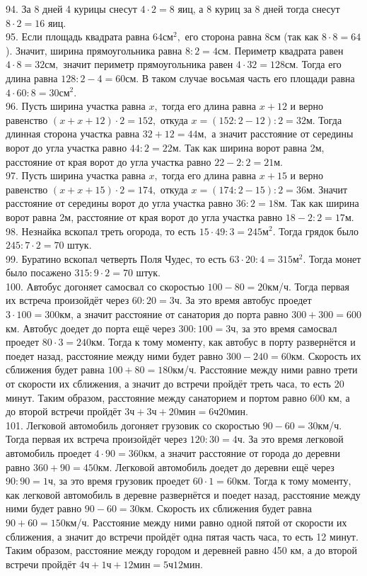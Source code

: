 \documentclass[12pt]{article}
\begin{document}
94. За 8 дней 4 курицы снесут $4\cdot2=8$ яиц, а 8 куриц за 8 дней тогда снесут $8\cdot2=16$ яиц.\\
95. Если площадь квадрата равна $64\text{см}^2,$ его сторона равна $8\text{см}$ (так как $8\cdot8=64$). Значит, ширина прямоугольника равна $8:2=4\text{см}.$ Периметр квадрата равен $4\cdot8=32\text{см},$ значит периметр прямоугольника равен $4\cdot32=128$см. Тогда его длина равна $128:2-4=60$см. В таком случае восьмая
часть его площади равна $4\cdot60:8=30\text{см}^2.$\\
96. Пусть ширина участка равна $x,$ тогда его длина равна $x+12$ и верно равенство $(x+x+12)\cdot2=152,$ откуда $x=(152:2-12):2=32\text{м}.$ Тогда длинная сторона участка равна $32+12=44\text{м},$ а значит расстояние от середины ворот до угла участка равно $44:2=22\text{м}.$ Так как ширина ворот равна 2м, расстояние от края ворот до угла участка равно $22-2:2=21\text{м}.$\\
97. Пусть ширина участка равна $x,$ тогда его длина равна $x+15$ и верно равенство $(x+x+15)\cdot2=174,$ откуда $x=(174:2-15):2=36\text{м}.$ Значит расстояние от середины ворот до угла участка равно $36:2=18\text{м}.$ Так как ширина ворот равна 2м, расстояние от края ворот до угла участка равно $18-2:2=17\text{м}.$\\
98. Незнайка вскопал треть огорода, то есть $15\cdot49:3=245\text{м}^2.$ Тогда грядок было $245:7\cdot2=70$ штук.\\
99. Буратино вскопал четверть Поля Чудес, то есть $63\cdot20:4=315\text{м}^2.$ Тогда монет было посажено $315:9\cdot2=70$ штук.\\
100. Автобус догоняет самосвал со скоростью $100-80=20$км/ч. Тогда первая их встреча произойдёт через $60:20=3$ч. За это время автобус проедет $3\cdot100=300$км, а значит расстояние от санатория до порта равно $300+300=600$км. Автобус доедет до порта ещё через $300:100=3$ч, за это время самосвал проедет $80\cdot3=240$км. Тогда к тому моменту, как автобус в порту развернётся и поедет назад, расстояние между ними будет равно $300-240=60$км. Скорость их сближения будет равна $100+80=180$км/ч. Расстояние между ними равно трети от скорости их сближения, а значит до встречи пройдёт треть часа, то есть 20 минут. Таким образом, расстояние между санаторием и портом равно 600 км, а до второй встречи пройдёт $3\text{ч}+3\text{ч}+20\text{мин}=6\text{ч}20\text{мин}.$\\
101. Легковой автомобиль догоняет грузовик со скоростью $90-60=30$км/ч. Тогда первая их встреча произойдёт через $120:30=4$ч. За это время легковой автомобиль проедет $4\cdot90=360$км, а значит расстояние от города до деревни равно $360+90=450$км. Легковой автомобиль доедет до деревни ещё через $90:90=1$ч, за это время грузовик проедет $60\cdot1=60$км. Тогда к тому моменту, как легковой автомобиль в деревне развернётся и поедет назад, расстояние между ними будет равно $90-60=30$км. Скорость их сближения будет равна $90+60=150$км/ч. Расстояние между ними равно одной пятой от скорости их сближения, а значит до встречи пройдёт одна пятая часть часа, то есть 12 минут. Таким образом, расстояние между городом и деревней равно 450 км, а до второй встречи пройдёт $4\text{ч}+1\text{ч}+12\text{мин}=5\text{ч}12\text{мин}.$\\
\end{document}
